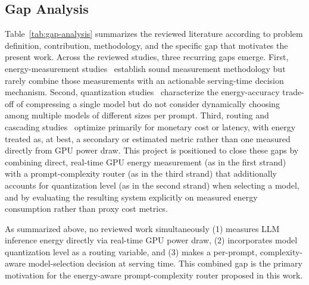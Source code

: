 \documentclass[runningheads]{llncs}
\begin{document}
\subsection{Gap Analysis}

Table~\ref{tab:gap-analysis} summarizes the reviewed literature according to problem definition, contribution, methodology, and the specific gap that motivates the present work. Across the reviewed studies, three recurring gaps emerge. First, energy-measurement studies~\cite{samsi2023words,fernandez2025energy,wilkins2024hybrid,ji2025systematic,niu2026tokenpowerbench} establish sound measurement methodology but rarely combine those measurements with an actionable serving-time decision mechanism. Second, quantization studies~\cite{frantar2022gptq,lin2024awq,xiao2023smoothquant,dettmers2022llmint8} characterize the energy-accuracy trade-off of compressing a single model but do not consider dynamically choosing among multiple models of different sizes per prompt. Third, routing and cascading studies~\cite{chen2023frugalgpt,ong2024routellm,ding2024hybridllm,khan2025optimizing} optimize primarily for monetary cost or latency, with energy treated as, at best, a secondary or estimated metric rather than one measured directly from GPU power draw. This project is positioned to close these gaps by combining direct, real-time GPU energy measurement (as in the first strand) with a prompt-complexity router (as in the third strand) that additionally accounts for quantization level (as in the second strand) when selecting a model, and by evaluating the resulting system explicitly on measured energy consumption rather than proxy cost metrics.

As summarized above, no reviewed work simultaneously (1) measures LLM inference energy directly via real-time GPU power draw, (2) incorporates model quantization level as a routing variable, and (3) makes a per-prompt, complexity-aware model-selection decision at serving time. This combined gap is the primary motivation for the energy-aware prompt-complexity router proposed in this work.

\begingroup
\footnotesize
\setlength{\tabcolsep}{3pt}
\renewcommand{\arraystretch}{1.15}
\end{document}
